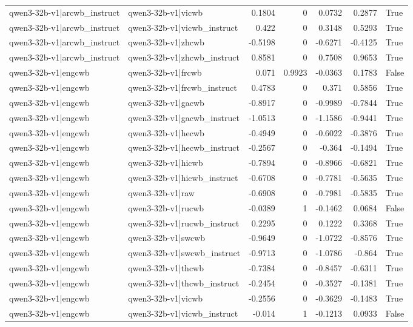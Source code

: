 \begin{table}
\begin{tabular}{l l r r r r l}
qwen3-32b-v1|arcwb_instruct & qwen3-32b-v1|vicwb & 0.1804 & 0 & 0.0732 & 0.2877 & True \\
qwen3-32b-v1|arcwb_instruct & qwen3-32b-v1|vicwb_instruct & 0.422 & 0 & 0.3148 & 0.5293 & True \\
qwen3-32b-v1|arcwb_instruct & qwen3-32b-v1|zhcwb & -0.5198 & 0 & -0.6271 & -0.4125 & True \\
qwen3-32b-v1|arcwb_instruct & qwen3-32b-v1|zhcwb_instruct & 0.8581 & 0 & 0.7508 & 0.9653 & True \\
qwen3-32b-v1|engcwb & qwen3-32b-v1|frcwb & 0.071 & 0.9923 & -0.0363 & 0.1783 & False \\
qwen3-32b-v1|engcwb & qwen3-32b-v1|frcwb_instruct & 0.4783 & 0 & 0.371 & 0.5856 & True \\
qwen3-32b-v1|engcwb & qwen3-32b-v1|gacwb & -0.8917 & 0 & -0.9989 & -0.7844 & True \\
qwen3-32b-v1|engcwb & qwen3-32b-v1|gacwb_instruct & -1.0513 & 0 & -1.1586 & -0.9441 & True \\
qwen3-32b-v1|engcwb & qwen3-32b-v1|hecwb & -0.4949 & 0 & -0.6022 & -0.3876 & True \\
qwen3-32b-v1|engcwb & qwen3-32b-v1|hecwb_instruct & -0.2567 & 0 & -0.364 & -0.1494 & True \\
qwen3-32b-v1|engcwb & qwen3-32b-v1|hicwb & -0.7894 & 0 & -0.8966 & -0.6821 & True \\
qwen3-32b-v1|engcwb & qwen3-32b-v1|hicwb_instruct & -0.6708 & 0 & -0.7781 & -0.5635 & True \\
qwen3-32b-v1|engcwb & qwen3-32b-v1|raw & -0.6908 & 0 & -0.7981 & -0.5835 & True \\
qwen3-32b-v1|engcwb & qwen3-32b-v1|rucwb & -0.0389 & 1 & -0.1462 & 0.0684 & False \\
qwen3-32b-v1|engcwb & qwen3-32b-v1|rucwb_instruct & 0.2295 & 0 & 0.1222 & 0.3368 & True \\
qwen3-32b-v1|engcwb & qwen3-32b-v1|swcwb & -0.9649 & 0 & -1.0722 & -0.8576 & True \\
qwen3-32b-v1|engcwb & qwen3-32b-v1|swcwb_instruct & -0.9713 & 0 & -1.0786 & -0.864 & True \\
qwen3-32b-v1|engcwb & qwen3-32b-v1|thcwb & -0.7384 & 0 & -0.8457 & -0.6311 & True \\
qwen3-32b-v1|engcwb & qwen3-32b-v1|thcwb_instruct & -0.2454 & 0 & -0.3527 & -0.1381 & True \\
qwen3-32b-v1|engcwb & qwen3-32b-v1|vicwb & -0.2556 & 0 & -0.3629 & -0.1483 & True \\
qwen3-32b-v1|engcwb & qwen3-32b-v1|vicwb_instruct & -0.014 & 1 & -0.1213 & 0.0933 & False \\

\end{tabular}
\end{table}
